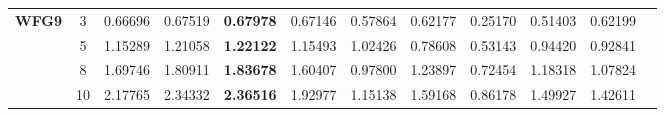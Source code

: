 \documentclass{sig-alternate}
\begin{document}
\begin{table}[!htb]
\begin{tabular}{|c|c|c|c|c|c|c|c|c|c|c|c|}
		\multirow{4}{*}{\textbf{WFG9}}  & 3          & 0.66696          & 0.67519           & \textbf{0.67978}      & 0.67146          & 0.57864             & 0.62177             & 0.25170            & 0.51403              & 0.62199          \\ \cline{2-11} 
		& 5          & 1.15289          & 1.21058           & \textbf{1.22122}      & 1.15493          & 1.02426             & 0.78608             & 0.53143            & 0.94420              & 0.92841          \\ \cline{2-11} 
		& 8          & 1.69746          & 1.80911           & \textbf{1.83678}      & 1.60407          & 0.97800             & 1.23897             & 0.72454            & 1.18318              & 1.07824          \\ \cline{2-11} 
		& 10         & 2.17765          & 2.34332           & \textbf{2.36516}      & 1.92977          & 1.15138             & 1.59168             & 0.86178            & 1.49927              & 1.42611          \\ \hline
	\end{tabular}
\end{table}
\end{document}
